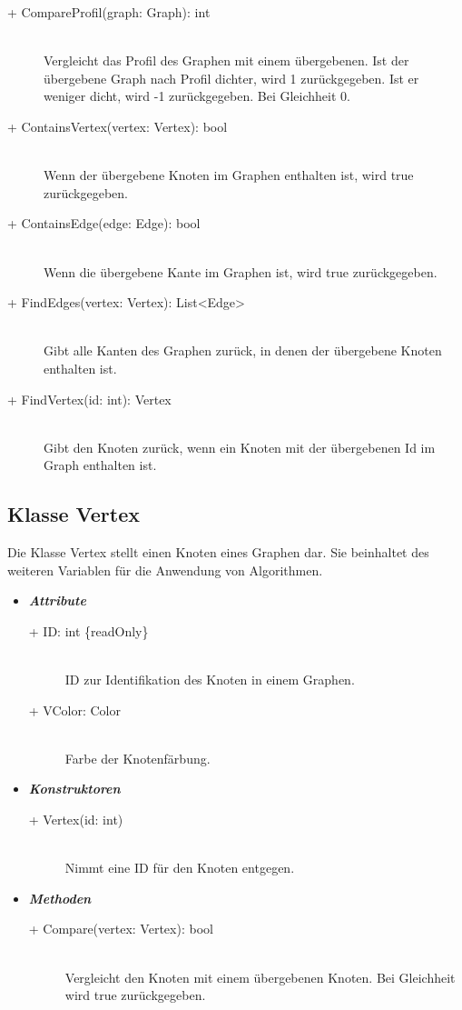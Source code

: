 \documentclass[13pt]{scrreprt}
\begin{document}
\begin{itemize}[label = {$\circ$}]
\begin{description}
			\item [+ CompareProfil(graph: Graph): int] \hfill \\ Vergleicht das Profil des Graphen mit einem übergebenen. Ist der übergebene Graph nach Profil dichter, wird 1 zurückgegeben. Ist er weniger dicht, wird -1 zurückgegeben. Bei Gleichheit 0.
			\item [+ ContainsVertex(vertex: Vertex): bool] \hfill \\ Wenn der übergebene Knoten im Graphen enthalten ist, wird true zurückgegeben.
			\item [+ ContainsEdge(edge: Edge): bool] \hfill \\ Wenn die übergebene Kante im Graphen ist, wird true zurückgegeben.
			\item [+ FindEdges(vertex: Vertex): List<Edge>] \hfill \\ Gibt alle Kanten des Graphen zurück, in denen der übergebene Knoten enthalten ist.
			\item [+ FindVertex(id: int): Vertex] \hfill \\ Gibt den Knoten zurück, wenn ein Knoten mit der übergebenen Id im Graph enthalten ist.
		\end{description}
	\end{itemize}
	\newpage
	\subsection{Klasse Vertex}
	Die Klasse Vertex stellt einen Knoten eines Graphen dar. Sie beinhaltet des weiteren Variablen für die Anwendung von Algorithmen.
	\begin{itemize}[label = {$\circ$}]
		\item {\large \textbf{\textit{Attribute}}\par}
		\begin{description}
			\item [+ ID: int \{readOnly\}] \hfill \\ ID zur Identifikation des Knoten in einem Graphen.
			\item [+ VColor: Color] \hfill \\ Farbe der Knotenfärbung.
		\end{description}
		\item {\large \textbf{\textit{Konstruktoren}}\par}
		\begin{description}
			\item [+ Vertex(id: int)] \hfill \\ Nimmt eine ID für den Knoten entgegen.
		\end{description}
		\item {\large \textbf{\textit{Methoden}}\par}
		\begin{description}
			\item [+ Compare(vertex: Vertex): bool] \hfill \\ Vergleicht den Knoten mit einem übergebenen Knoten. Bei Gleichheit wird true zurückgegeben.
		\end{description}
	\end{itemize}
	
\end{document}

